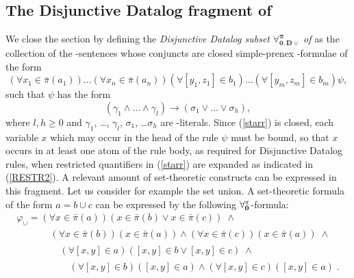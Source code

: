 \documentclass[manyauthors]{fundam}
\newcommand{\ForallpizeroDisjDatalog}{\ensuremath{\mathbf{\forall_{0,D\vee}^{\pi}}}\xspace}
\newcommand{\pairin}[3]{\left[#1,#2\right] \in #3}
\newcommand{\nonpairin}[2]{#1 \in \bar{\pi}(#2)}
\begin{document}
\subsection{The Disjunctive Datalog fragment of \Forallpizero}\label{DISJFORALL}
We close the section by defining the \emph{Disjunctive Datalog subset}
$\ForallpizeroDisjDatalog$\emph{ of }\Forallpizero as the collection
of the \Forallpizero-sentences whose conjuncts are
closed simple-prenex \Forallpizero-formulae
of the form
\begin{equation}\label{starr}
  (\forall \nonpairin{x_1}{a_1})\ldots(\forall 
\nonpairin{x_n}{a_n})(\forall \pairin{y_1}{z_1}{b_1})\ldots(\forall 
\pairin{y_m}{z_m}{b_m})\psi,
\end{equation}
such that $\psi$ has the form
\[
   \left(\gamma_1 \wedge \ldots \wedge \gamma_l\right) \rightarrow
   \left(\sigma_1 \vee \ldots \vee \sigma_h\right) ,
\]
where $l,h \geq 0$ and $\gamma_1$, \ldots, $\gamma_l$, $\sigma_1$,
\ldots $\sigma_h$ are \Forallpizero-literals.  Since (\ref{starr}) is
closed, each variable $x$ which may occur in the head of the rule
$\psi$ must be bound, so that $x$ occurs in at least one atom of the
rule body, as required for Disjunctive Datalog rules, when restricted
quantifiers in (\ref{starr}) are expanded as indicated in
(\ref{RESTR2}).  A relevant amount of set-theoretic constructs can be
expressed in this fragment. 
Let us consider for example the set union.
A set-theoretic formula of the form $a=b \cup c$ can be expressed by
the following $\mathbf{\forall_{0}^{\pi}}$-formula: 
\[
\begin{array}{l}
\varphi_{\cup} = \left(\forall \nonpairin{x}{a}\right)\left(\nonpairin{x}{b}
\vee \nonpairin{x}{c}\right) \; \wedge \\
\phantom{\varphi_{\cup} = }\quad  \left(\forall
\nonpairin{x}{b}\right)\left(\nonpairin{x}{a}\right) \wedge \left(\forall
\nonpairin{x}{c}\right)\left(\nonpairin{x}{a}\right) \; \wedge\\
\phantom{\varphi_{\cup} = } \quad\quad\left(\forall
\pairin{x}{y}{a}\right)\left(\pairin{x}{y}{b} \vee \pairin{x}{y}{c}\right)
\; \wedge \\
\phantom{\varphi_{\cup} = }\quad\quad\quad  \left(\forall
\pairin{x}{y}{b}\right)\left(\pairin{x}{y}{a}\right) \wedge \left(\forall
\pairin{x}{y}{c}\right)\left(\pairin{x}{y}{a}\right) \; .
\end{array}
\]
\end{document}
